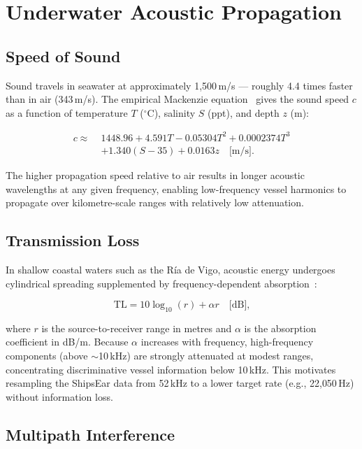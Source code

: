 \documentclass[conference]{IEEEtran}
\begin{document}
% 
\section{Underwater Acoustic Propagation}

\subsection{Speed of Sound}

Sound travels in seawater at approximately 1{,}500\,m/s --- roughly 4.4 times
faster than in air (343\,m/s). The empirical Mackenzie
equation~\cite{mackenzie1981} gives the sound speed $c$ as a function of
temperature $T$ ($^\circ$C), salinity $S$ (ppt), and depth $z$ (m):

\begin{align}
  c \approx\; & 1448.96 + 4.591T - 0.05304T^2 + 0.0002374T^3 \nonumber \\
              & + 1.340(S-35) + 0.0163z \quad \text{[m/s].}
  \label{eq:mackenzie}
\end{align}

The higher propagation speed relative to air results in longer acoustic
wavelengths at any given frequency, enabling low-frequency vessel harmonics
to propagate over kilometre-scale ranges with relatively low attenuation.

\subsection{Transmission Loss}

In shallow coastal waters such as the R\'ia de Vigo, acoustic energy
undergoes cylindrical spreading supplemented by frequency-dependent
absorption~\cite{urick1983}:

\begin{equation}
  \mathrm{TL} = 10 \log_{10}(r) + \alpha r \quad \text{[dB],}
  \label{eq:tl}
\end{equation}

where $r$ is the source-to-receiver range in metres and $\alpha$ is the
absorption coefficient in dB/m. Because $\alpha$ increases with frequency,
high-frequency components (above $\sim$10\,kHz) are strongly attenuated at
modest ranges, concentrating discriminative vessel information below 10\,kHz.
This motivates resampling the ShipsEar data from 52\,kHz to a lower target
rate (e.g., 22{,}050\,Hz) without information loss.

\subsection{Multipath Interference}
\end{document}
